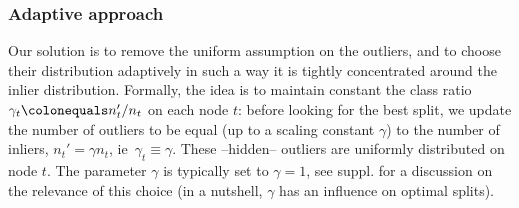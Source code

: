 \subsubsection{Adaptive approach} 
Our solution is to remove the uniform assumption on
the outliers, and to choose their distribution adaptively in such a way it is
tightly concentrated around the inlier distribution. Formally, the idea is to
maintain constant the class ratio $\gamma_t \colonequals n_t' / n_t$ on each
node $t$: before looking for the best split, we update the number of outliers
to be equal (up to a scaling constant $\gamma$) to the number of inliers, $n_t'
= \gamma n_t$, \acs{ie}~$\gamma_t \equiv \gamma$. These --hidden-- outliers are
uniformly distributed on node $t$. The parameter $\gamma$ is typically set to
$\gamma = 1$, see suppl.  for a discussion on
the relevance of this choice (in a nutshell, $\gamma$ has an influence on
optimal splits).
%
